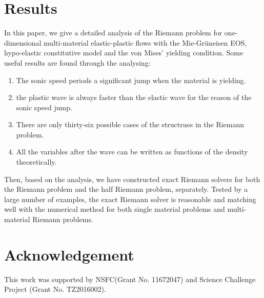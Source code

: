 \documentclass{article}
\numberwithin{equation}{section}
\numberwithin{table}{section}
\begin{document}
\section{Results}
In this paper, we give a detailed analysis of the Riemann problem for one-dimensional  multi-material elastic-plastic flows with the  Mie-Gr\"uneisen EOS, hypo-elastic constitutive model and the von Mises' yielding condition.  Some useful results are found through the analysing:
\begin{enumerate}
	\item The sonic speed periods a significant jump when the material is yielding.
	\item the plastic wave is always faster than the elastic wave for the reason of the sonic speed jump.
	
	  \item There are only thirty-six possible cases of the structrues in the Riemann problem.
	\item All the variables after the wave can be written as functions of the density theoretically.
	\end{enumerate}
	  Then, based on the analysis, we have constructed exact Riemann solvers for  both the Riemann problem  and the half Riemann problem, separately. Tested by  a large number of examples, the exact Riemann solver is reasonable and matching  well with the numerical method for both  single material problems and multi-material Riemann problems.

\section*{Acknowledgement}
This work was supported by NSFC(Grant No. 11672047) and Science Challenge Project (Grant No. TZ2016002).


\end{document}
